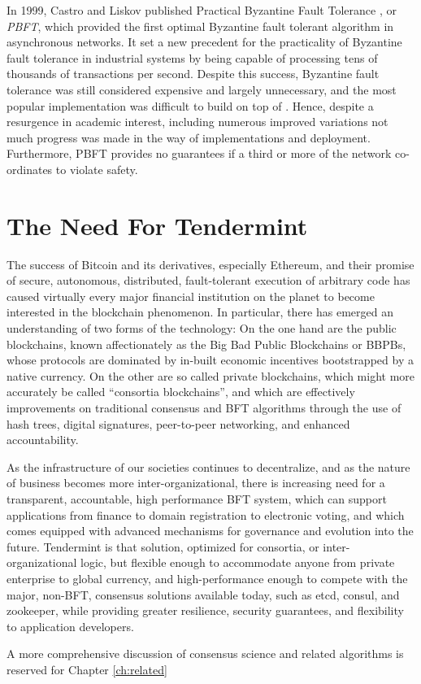 In 1999, Castro and Liskov published Practical Byzantine Fault Tolerance \cite{pbft}, or \emph{PBFT}, 
which provided the first optimal Byzantine fault tolerant algorithm in asynchronous networks.
It set a new precedent for the practicality of Byzantine fault tolerance in industrial systems by being capable 
of processing tens of thousands of transactions per second.
Despite this success, Byzantine fault tolerance was still considered expensive and largely unnecessary, 
and the most popular implementation was difficult to build on top of \cite{ppbft}.
Hence, despite a resurgence in academic interest, including numerous improved variations \cite{yin2003separating, kotla2007zyzzyva}
not much progress was made in the way of implementations and deployment.
Furthermore, PBFT provides no guarantees if a third or more of the network co-ordinates to violate safety.

\section{The Need For Tendermint}

The success of Bitcoin and its derivatives, especially Ethereum, and their promise of secure, autonomous, distributed, fault-tolerant execution of arbitrary code has caused virtually every major financial institution on the planet to become interested in the blockchain phenomenon. 
In particular, there has emerged an understanding of two forms of the technology:
On the one hand are the public blockchains, known affectionately as the Big Bad Public Blockchains or BBPBs, 
whose protocols are dominated by in-built economic incentives bootstrapped by a native currency.
On the other are so called private blockchains, which might more accurately be called ``consortia blockchains'',
and which are effectively improvements on traditional consensus and BFT algorithms through the use of hash trees, digital signatures, 
peer-to-peer networking, and enhanced accountability.

As the infrastructure of our societies continues to decentralize, and as the nature of business becomes more inter-organizational,
there is increasing need for a transparent, accountable, high performance BFT system, which can support applications from finance to domain registration to electronic voting,
and which comes equipped with advanced mechanisms for governance and evolution into the future.
Tendermint is that solution, optimized for consortia, or inter-organizational logic, but flexible enough to accommodate anyone from private enterprise to global currency,
and high-performance enough to compete with the major, non-BFT, consensus solutions available today, such as etcd, consul, and zookeeper, while providing greater resilience, security guarantees, and flexibility to application developers.

A more comprehensive discussion of consensus science and related algorithms is reserved for Chapter \ref{ch:related}

